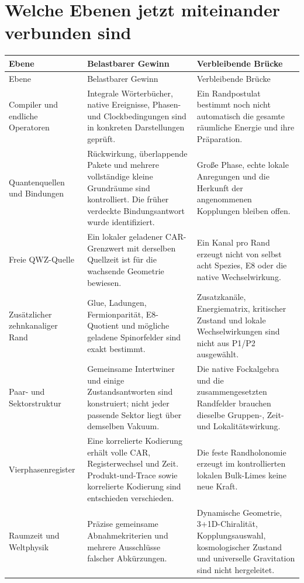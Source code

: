 \section{Welche Ebenen jetzt miteinander verbunden sind}
\begin{longtable}{@{}P{.22\textwidth}P{.34\textwidth}P{.36\textwidth}@{}}
\toprule Ebene & Belastbarer Gewinn & Verbleibende Brücke\\\midrule\endfirsthead
\toprule Ebene & Belastbarer Gewinn & Verbleibende Brücke\\\midrule\endhead
Compiler und endliche Operatoren & Integrale Wörterbücher, native Ereignisse, Phasen- und Clockbedingungen sind in konkreten Darstellungen geprüft. & Ein Randpostulat bestimmt noch nicht automatisch die gesamte räumliche Energie und ihre Präparation.\\
Quantenquellen und Bindungen & Rückwirkung, überlappende Pakete und mehrere vollständige kleine Grundräume sind kontrolliert. Die früher verdeckte Bindungsantwort wurde identifiziert. & Große Phase, echte lokale Anregungen und die Herkunft der angenommenen Kopplungen bleiben offen.\\
Freie QWZ-Quelle & Ein lokaler geladener CAR-Grenzwert mit derselben Quellzeit ist für die wachsende Geometrie bewiesen. & Ein Kanal pro Rand erzeugt nicht von selbst acht Spezies, E8 oder die native Wechselwirkung.\\
Zusätzlicher zehnkanaliger Rand & Glue, Ladungen, Fermionparität, E8-Quotient und mögliche geladene Spinorfelder sind exakt bestimmt. & Zusatzkanäle, Energiematrix, kritischer Zustand und lokale Wechselwirkungen sind nicht aus P1/P2 ausgewählt.\\
Paar- und Sektorstruktur & Gemeinsame Intertwiner und einige Zustandsantworten sind konstruiert; nicht jeder passende Sektor liegt über demselben Vakuum. & Die native Fockalgebra und die zusammengesetzten Randfelder brauchen dieselbe Gruppen-, Zeit- und Lokalitätswirkung.\\
Vierphasenregister & Eine korrelierte Kodierung erhält volle CAR, Registerwechsel und Zeit. Produkt-und-Trace sowie korrelierte Kodierung sind entschieden verschieden. & Die feste Randholonomie erzeugt im kontrollierten lokalen Bulk-Limes keine neue Kraft.\\
Raumzeit und Weltphysik & Präzise gemeinsame Abnahmekriterien und mehrere Ausschlüsse falscher Abkürzungen. & Dynamische Geometrie, 3+1D-Chiralität, Kopplungsauswahl, kosmologischer Zustand und universelle Gravitation sind nicht hergeleitet.\\\bottomrule
\end{longtable}

